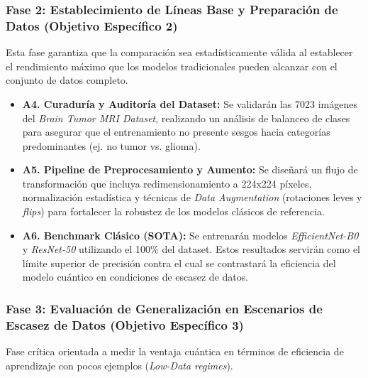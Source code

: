 \documentclass[12pt,letterpaper]{article}
\begin{document}
    \subsubsection{Fase 2: Establecimiento de Líneas Base y Preparación de Datos (Objetivo Específico 2)}
    Esta fase garantiza que la comparación sea estadísticamente válida al establecer el rendimiento máximo que los modelos tradicionales pueden alcanzar con el conjunto de datos completo.
    
    \begin{itemize}
        \item \textbf{A4. Curaduría y Auditoría del Dataset:} Se validarán las 7023 imágenes del \textit{Brain Tumor MRI Dataset}, realizando un análisis de balanceo de clases para asegurar que el entrenamiento no presente sesgos hacia categorías predominantes (ej. no tumor vs. glioma).
        \item \textbf{A5. Pipeline de Preprocesamiento y Aumento:} Se diseñará un flujo de transformación que incluya redimensionamiento a 224x224 píxeles, normalización estadística y técnicas de \textit{Data Augmentation} (rotaciones leves y \textit{flips}) para fortalecer la robustez de los modelos clásicos de referencia.
        \item \textbf{A6. Benchmark Clásico (SOTA):} Se entrenarán modelos \textit{EfficientNet-B0} y \textit{ResNet-50} utilizando el 100\% del dataset. Estos resultados servirán como el límite superior de precisión contra el cual se contrastará la eficiencia del modelo cuántico en condiciones de escasez de datos.
    \end{itemize}
    
    \subsubsection{Fase 3: Evaluación de Generalización en Escenarios de Escasez de Datos (Objetivo Específico 3)}
    Fase crítica orientada a medir la ventaja cuántica en términos de eficiencia de aprendizaje con pocos ejemplos (\textit{Low-Data regimes}).
    
\end{document}
